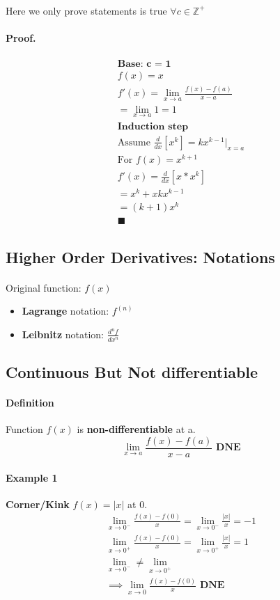 \documentclass{article}
\begin{document}
	\paragraph{} Here we only prove statements is true $\forall c \in \mathbb{Z}^{+}$
	\paragraph{Proof.}
	\begin{align*}
		\textbf{Base: c = 1} \\
		f(x) = x \\
		f'(x) = \lim_{x \to a}\frac{f(x) - f(a)}{x - a} \\
		= \lim_{x \to a}1 = 1\\
		\textbf{Induction step} \\
		\text{Assume } \frac{d}{dx}[x^k] = kx^{k-1} \vert_{x = a} \\
		\text{For } f(x) = x^{k+1} \\
		f'(x) = \frac{d}{dx}[x * x^k] \\
		= x ^ k + x k x^{k-1} \\
		= (k+1)x^k\\
		\blacksquare
	\end{align*}
	\subsection{Higher Order Derivatives: Notations}
	\paragraph{} Original function: $f(x)$
	\begin{itemize}
		\item \textbf{Lagrange} notation: $f^{(n)}$
		\item \textbf{Leibnitz} notation: $\frac{d^n f}{dx^n}$
	\end{itemize}
	\subsection{Continuous But Not differentiable}
	\paragraph{Definition} Function $f(x)$ is \textbf{non-differentiable} at a.
	\[
		\lim_{x \to a}\frac{f(x) - f(a)}{x - a} \textbf{ DNE}
	\]
	\paragraph{Example 1} \textbf{Corner/Kink} $f(x) = \lvert x \rvert$ at 0.
	\begin{align*}
		\lim_{x \to 0^-}\frac{f(x) - f(0)}{x} = \lim_{x \to 0^-}\frac{\lvert x \rvert}{x} = -1 \\
		\lim_{x \to 0^+}\frac{f(x) - f(0)}{x} = \lim_{x \to 0^+}\frac{\lvert x \rvert}{x} = 1\\
		\lim_{x \to 0^-} \neq \lim_{x \to 0^+} \\
		\implies \lim_{x \to 0}\frac{f(x) - f(0)}{x} \textbf{ DNE} \\
	\end{align*}
		
\end{document}
